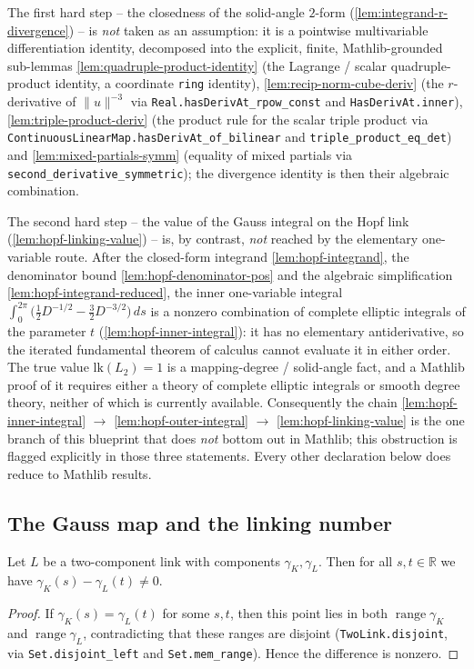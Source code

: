 The first hard step -- the closedness of the solid-angle $2$-form
(\cref{lem:integrand-r-divergence}) -- is \emph{not} taken as an assumption: it is
a pointwise multivariable differentiation identity, decomposed into the explicit,
finite, Mathlib-grounded sub-lemmas \cref{lem:quadruple-product-identity} (the
Lagrange / scalar quadruple-product identity, a coordinate \texttt{ring}
identity), \cref{lem:recip-norm-cube-deriv} (the $r$-derivative of
$\lVert u\rVert^{-3}$ via \texttt{Real.hasDerivAt\_rpow\_const} and
\texttt{HasDerivAt.inner}), \cref{lem:triple-product-deriv} (the product rule for
the scalar triple product via
\texttt{ContinuousLinearMap.hasDerivAt\_of\_bilinear} and
\texttt{triple\_product\_eq\_det}) and \cref{lem:mixed-partials-symm} (equality of
mixed partials via \texttt{second\_derivative\_symmetric}); the divergence
identity is then their algebraic combination.

The second hard step -- the value of the Gauss integral on the Hopf link
(\cref{lem:hopf-linking-value}) -- is, by contrast, \emph{not} reached by the
elementary one-variable route. After the closed-form integrand
\cref{lem:hopf-integrand}, the denominator bound \cref{lem:hopf-denominator-pos}
and the algebraic simplification \cref{lem:hopf-integrand-reduced}, the inner
one-variable integral $\int_0^{2\pi}\bigl(\tfrac12 D^{-1/2}-\tfrac32
D^{-3/2}\bigr)\,ds$ is a nonzero combination of complete elliptic integrals of the
parameter $t$ (\cref{lem:hopf-inner-integral}): it has no elementary
antiderivative, so the iterated fundamental theorem of calculus cannot evaluate
it in either order. The true value $\mathrm{lk}(L_2)=1$ is a mapping-degree /
solid-angle fact, and a Mathlib proof of it requires either a theory of complete
elliptic integrals or smooth degree theory, neither of which is currently
available. Consequently the chain \cref{lem:hopf-inner-integral} $\to$
\cref{lem:hopf-outer-integral} $\to$ \cref{lem:hopf-linking-value} is the one
branch of this blueprint that does \emph{not} bottom out in Mathlib; this
obstruction is flagged explicitly in those three statements. Every other
declaration below does reduce to Mathlib results.

\subsection{The Gauss map and the linking number}

\begin{lemma}
    \label{lem:components-nonzero}
    Let $L$ be a two-component link with components $\gamma_K,\gamma_L$. Then for
    all $s,t\in\mathbb{R}$ we have $\gamma_K(s) - \gamma_L(t) \neq 0$.
\end{lemma}
\begin{proof}
    If $\gamma_K(s) = \gamma_L(t)$ for some $s,t$, then this point lies in both
    $\operatorname{range}\gamma_K$ and $\operatorname{range}\gamma_L$, contradicting
    that these ranges are disjoint (\texttt{TwoLink.disjoint}, via
    \texttt{Set.disjoint\_left} and \texttt{Set.mem\_range}). Hence the difference
    is nonzero.
\end{proof}

